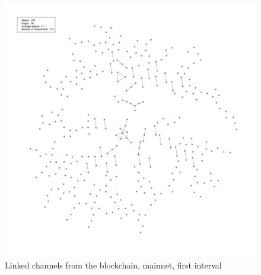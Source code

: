 \begin{figure}[ht]
    \centering
    \includegraphics[width=13cm]{figures/graphs/cg_bc_mainnet_run1.png}
    \caption{Linked channels from the blockchain, mainnet, first interval}
    \label{fig:channel_network_BC_mainnet}
\end{figure}
